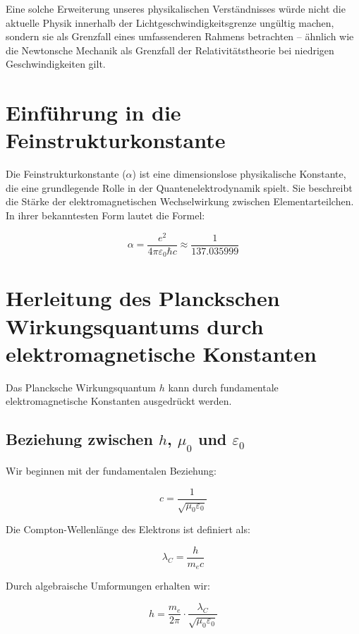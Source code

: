 \documentclass{article}
\begin{document}
	Eine solche Erweiterung unseres physikalischen Verständnisses würde nicht die aktuelle Physik innerhalb der Lichtgeschwindigkeitsgrenze ungültig machen, sondern sie als Grenzfall eines umfassenderen Rahmens betrachten – ähnlich wie die Newtonsche Mechanik als Grenzfall der Relativitätstheorie bei niedrigen Geschwindigkeiten gilt.
	
	\section{Einführung in die Feinstrukturkonstante}
	
	Die Feinstrukturkonstante ($\alpha$) ist eine dimensionslose physikalische Konstante, die eine grundlegende Rolle in der Quantenelektrodynamik spielt. Sie beschreibt die Stärke der elektromagnetischen Wechselwirkung zwischen Elementarteilchen. In ihrer bekanntesten Form lautet die Formel:
	
	\begin{equation}
		\alpha = \frac{e^2}{4\pi\varepsilon_0\hbar c} \approx \frac{1}{137.035999}
	\end{equation}
	
	\section{Herleitung des Planckschen Wirkungsquantums durch elektromagnetische Konstanten}
	
	Das Plancksche Wirkungsquantum $h$ kann durch fundamentale elektromagnetische Konstanten ausgedrückt werden.
	
	\subsection{Beziehung zwischen $h$, $\mu_0$ und $\varepsilon_0$}
	
	Wir beginnen mit der fundamentalen Beziehung:
	
	\begin{equation}
		c = \frac{1}{\sqrt{\mu_0\varepsilon_0}}
	\end{equation}
	
	Die Compton-Wellenlänge des Elektrons ist definiert als:
	
	\begin{equation}
		\lambda_C = \frac{h}{m_e c}
	\end{equation}
	
	Durch algebraische Umformungen erhalten wir:
	
	\begin{equation}
		h = \frac{m_e}{2\pi} \cdot \frac{\lambda_C}{\sqrt{\mu_0\varepsilon_0}}
	\end{equation}
	
\end{document}
